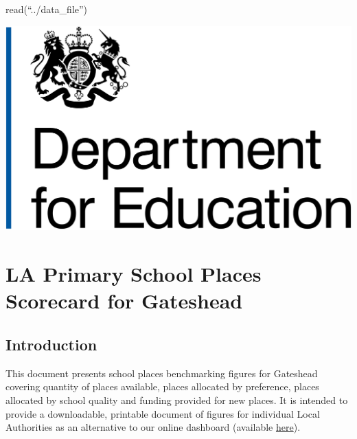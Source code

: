 \documentclass[
]{article}
\author{}
\date{\vspace{-2.5em}}
\begin{document}
read(``../data\_file'')

\includegraphics[width=0.25\linewidth]{"images/Department_for_Education.png"}
\vspace{2.4cm}

\hypertarget{la-primary-school-places-scorecard-for-gateshead}{%
\section{LA Primary School Places Scorecard for
Gateshead}\label{la-primary-school-places-scorecard-for-gateshead}}

\vspace{3.2cm}
\vspace*{\fill}
\color{dfeheadingblue}{\hrule}
\color{black}

\hypertarget{introduction}{%
\subsection{Introduction}\label{introduction}}

This document presents school places benchmarking figures for Gateshead
covering quantity of places available, places allocated by preference,
places allocated by school quality and funding provided for new places.
It is intended to provide a downloadable, printable document of figures
for individual Local Authorities as an alternative to our online
dashboard (available
\href{https://department-for-education.shinyapps.io/la-school-places-scorecards/}{here}).

\vspace{12pt}

\end{document}
